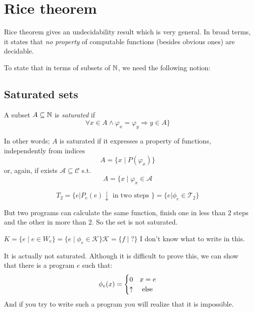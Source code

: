 \chapter {Rice theorem}

Rice theorem gives an undecidability result which is very general. In broad
terms, it states that \emph{no property} of computable functions
(besides obvious ones) are decidable.

To state that in terms of subsets of $\mathbb{N}$, we need the following
notion:

\section{Saturated sets}
\begin{definition}
  A subset $A \subseteq \mathbb{N}$ is \emph{saturated} if
  \[
    \forall x \in A \wedge \varphi_x = \varphi_y \Rightarrow y \in A \}
  \]
\end{definition}

In other words; $A$ is saturated if it expresses a property of
functions, independently from indices
\[A = \{x \mid P(\varphi_x)\}\]
or, again, if exists $\mathcal{A} \subseteq \mathcal{C}$ s.t.
\[A = \{ x \mid \varphi_x \in \mathcal{A}\]

\begin{example}
  \[
    T_2 = \{ e | P_e(e)\downarrow \mbox{ in two steps } \} =
    \{e|\phi_e \in \mathcal{T}_2 \}
  \]

  But two programs can calculate the same function, finish one in
  less than 2 steps and the other in more than 2. So the set is not
  saturated.
\end{example}

\begin{example}

  \begin{center}
    $ K = \{e \mid e\in W_e \} = \{e \mid \phi_e\in \mathcal{K} \}
  \mathcal{K} = \{f \mid ? \}$ I don't know what to write in this.
  \end{center}

  It is actually not saturated. Although it is difficult to prove this,
  we can show that there is a program $e$ such that:
  \begin{equation*}
    \phi_e(x) = \begin{cases}
      0 & x = e \\
      \uparrow & $ else $
    \end{cases}
  \end{equation*}
  And if you try to write such a program you will realize that it is
  impossible.
\end{example}


